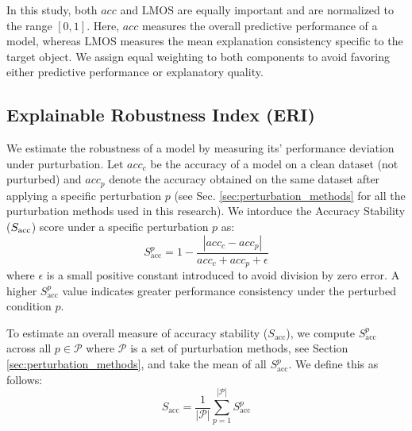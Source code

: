 \documentclass[a4paper,fleqn]{cas-dc}
\begin{document}
	In this study, both $acc$ and $\mathrm{LMOS}$ are equally important and are normalized to the range $[0,1]$.
	Here, $acc$ measures the overall predictive performance of a model, whereas $\mathrm{LMOS}$ measures the mean explanation consistency specific to the target object. 
	We assign equal weighting to both components to avoid favoring either predictive performance or explanatory quality.
	
	\subsection{Explainable Robustness Index (ERI)}
	We estimate the robustness of a model by measuring its' performance deviation under purturbation.  
	Let $acc_c$ be the accuracy of a model on a clean dataset (not purturbed) and $acc_p$ denote the accuracy obtained on the same dataset after applying a specific perturbation $p$ (see Sec. \ref{sec:perturbation_methods} for all the purturbation methods used in this research). 
	We intorduce the Accuracy Stability ($S_{\rm{acc}}$) score under a specific perturbation $p$ as:
	$$	S_{\mathrm{acc}}^{p} = 1 - \frac{ | acc_c - acc_p | }
	{acc_c + acc_p + \epsilon}$$
	where $\epsilon$ is a small positive constant introduced to avoid division by zero error. 
	A higher $S_{\mathrm{acc}}^p$ value indicates greater performance consistency under the perturbed condition $p$.
	
	To estimate an overall measure of accuracy stability ($S_{\mathrm{acc}}$), we compute $S_{\mathrm{acc}}^p$ across all $p \in \mathcal P$ where $\mathcal P$ is a set of purturbation methods, see Section \ref{sec:perturbation_methods}, and take the mean of all $S_{\mathrm{acc}}^p$. 
	We define this as follows:
	$$S_{\text{acc}} = \frac{1}{|\mathcal P|} \sum_{p=1}^{|\mathcal P|} S_{\text{acc}}^{p}$$
	
\end{document}
